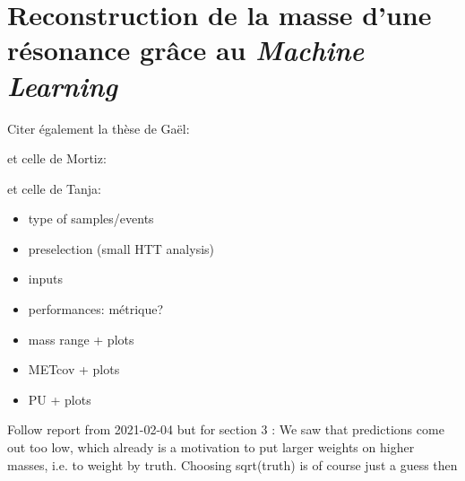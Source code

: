 \chapter{Reconstruction de la masse d'une résonance grâce au \emph{Machine Learning}}\label{chapter-ML}



Citer également la thèse de Gaël:\\

et celle de Mortiz:\\

et celle de Tanja:\\

\begin{itemize}
\item type of samples/events
\item preselection (small HTT analysis)
\item inputs
\item performances: métrique?
\item mass range + plots
\item METcov + plots
\item PU + plots
\end{itemize}

Follow report from 2021-02-04 but for section 3 : We saw that predictions come out too low, which already is a motivation to put larger weights on higher masses, i.e. to weight by truth. Choosing sqrt(truth) is of course just a guess then

